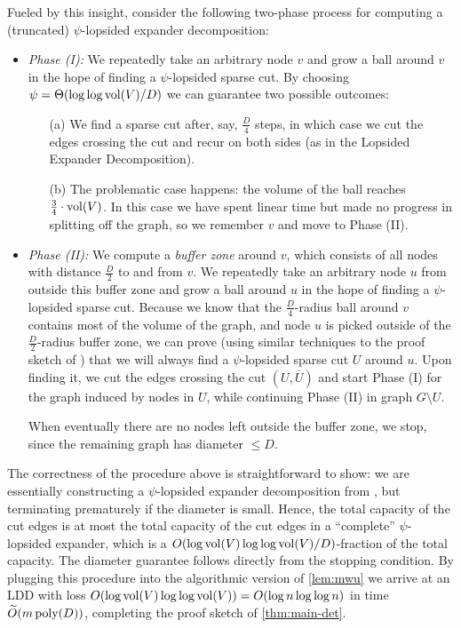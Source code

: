 Fueled by this insight, consider the following two-phase process for computing a (truncated) $\psi$-lopsided expander decomposition:
\begin{itemize}
    \setlength\parindent{1.6em}
    \setlength\parskip{0pt}
 	\item \emph{Phase (I):} We repeatedly take an arbitrary node $v$ and grow a ball around $v$ in the hope of finding a $\psi$-lopsided sparse cut. By choosing $\psi = \Theta(\log\log \operatorname{vol}(V) / D)$ we can guarantee two possible outcomes: 
 	\begin{enumerate}
 		\item[(a)] We find a sparse cut after, say, $\frac{D}{4}$ steps, in which case we cut the edges crossing the cut and recur on both sides (as in the Lopsided Expander Decomposition).
 		\item[(b)] The problematic case happens: the volume of the ball reaches $\frac{3}{4} \cdot \operatorname{vol}(V)$. In this case we have spent linear time but made no progress in splitting off the graph, so we remember $v$ and move to Phase (II).
 	\end{enumerate}
	
 	\item \emph{Phase (II):} We compute a \emph{buffer zone} around $v$, which consists of all nodes with distance $\frac{D}{2}$ to and from $v$. We repeatedly take an arbitrary node $u$ from outside this buffer zone and grow a ball around $u$ in the hope of finding a $\psi$-lopsided sparse cut. Because we know that the $\frac{D}{4}$-radius ball around $v$ contains most of the volume of the graph, and node $u$ is picked outside of the $\frac{D}{2}$-radius buffer zone, we can prove (using similar techniques to the proof sketch of ) that we will always find a $\psi$-lopsided sparse cut $U$ around $u$. Upon finding it, we cut the edges crossing the cut $(U, \overline U)$ and start Phase (I) for the graph induced by nodes in $U$, while continuing Phase (II) in graph $G \setminus U$.
 	
 	When eventually there are no nodes left outside the buffer zone, we stop, since the remaining graph has diameter $\leq D$.
\end{itemize}

The correctness of the procedure above is straightforward to show: we are essentially constructing a $\psi$-lopsided expander decomposition from , but terminating prematurely if the diameter is small. Hence, the total capacity of the cut edges is at most the total capacity of the cut edges in a ``complete'' $\psi$-lopsided expander, which is a $O(\log \operatorname{vol}(V) \log\log \operatorname{vol}(V) / D)$-fraction of the total capacity. The diameter guarantee follows directly from the stopping condition. By plugging this procedure into the algorithmic version of \cref{lem:mwu} we arrive at an LDD with loss $O(\log \operatorname{vol}(V) \log\log \operatorname{vol}(V)) = O(\log n \log\log n)$ in time $\widetilde{O}(m \operatorname{\text{{\rm poly}}}(D))$, completing the proof sketch of \cref{thm:main-det}.


